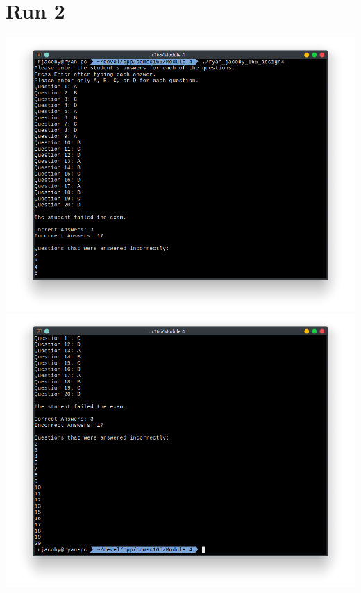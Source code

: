 \documentclass[letterpaper, 11pt]{article}
\begin{document}
\section*{Run 2}
\includegraphics[scale=0.5]{run2_1.png} \\
\includegraphics[scale=0.5]{run2_2.png}
\end{document}
